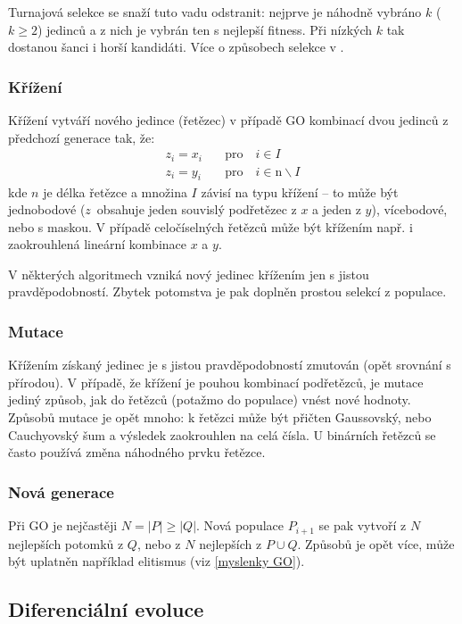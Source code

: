 Turnajová selekce se snaží tuto vadu odstranit: nejprve je náhodně vybráno $k$ ($k\geq 2$) jedinců a z nich je vybrán ten s nejlepší fitness. Při nízkých $k$ tak dostanou šanci i horší kandidáti. Více o způsobech selekce v \cite{GO ebook}.

\subsubsection{Křížení}

Křížení vytváří nového jedince (řetězec) v případě GO kombinací dvou jedinců z předchozí generace tak, že:
\[
\begin{split}
z_i = x_i &\quad\text{pro}\quad i \in I \\
z_i = y_i &\quad\text{pro}\quad i \in \text{\^{n}}\backslash I
\end{split}
\]
kde $n$ je délka řetězce a množina $I$ závisí na typu křížení -- to může být jednobodové ($z$~obsahuje jeden souvislý podřetězec z $x$ a jeden z $y$), vícebodové, nebo s maskou. V případě celočíselných řetězců může být křížením např. i zaokrouhlená lineární kombinace $x$ a $y$.

V některých algoritmech vzniká nový jedinec křížením jen s jistou pravděpodobností. Zbytek potomstva je pak doplněn prostou selekcí z populace.

\subsubsection{Mutace}

Křížením získaný jedinec je s jistou pravděpodobností zmutován (opět srovnání s přírodou). V případě, že křížení je pouhou kombinací podřetězců, je mutace jediný způsob, jak do řetězců (potažmo do populace) vnést nové hodnoty. Způsobů mutace je opět mnoho: k řetězci může být přičten Gaussovský, nebo Cauchyovský šum a výsledek zaokrouhlen na celá čísla. U binárních řetězců se často používá změna náhodného prvku řetězce.

\subsubsection{Nová generace}

Při GO je nejčastěji $N = |P| \geq |Q|$. Nová populace $P_{i+1}$ se pak vytvoří z $N$ nejlepších potomků z $Q$, nebo z $N$ nejlepších z $P \cup Q$. Způsobů je opět více, může být uplatněn například elitismus (viz \ref{myslenky GO}).

\subsection{Diferenciální evoluce}

